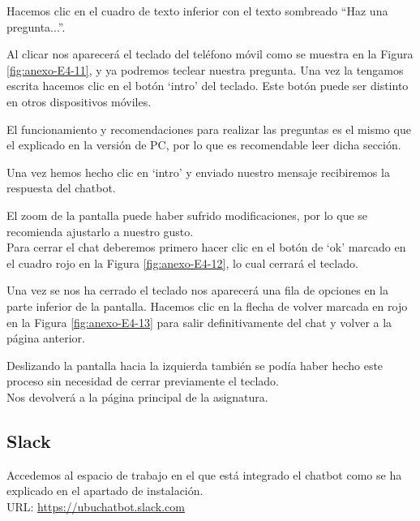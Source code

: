 
Hacemos clic en el cuadro de texto inferior con el texto sombreado ``Haz una pregunta...''.

\newpage

Al clicar nos aparecerá el teclado del teléfono móvil como se muestra en la Figura \ref{fig:anexo-E4-11}, y ya podremos teclear nuestra pregunta. Una vez la tengamos escrita hacemos clic en el botón `intro' del teclado. Este botón puede ser distinto en otros dispositivos móviles.


El funcionamiento y recomendaciones para realizar las preguntas es el mismo que el explicado en la versión de PC, por lo que es recomendable leer dicha sección.

\newpage

Una vez hemos hecho clic en `intro' y enviado nuestro mensaje recibiremos la respuesta del chatbot.

El zoom de la pantalla puede haber sufrido modificaciones, por lo que se recomienda ajustarlo a nuestro gusto.\\
Para cerrar el chat deberemos primero hacer clic en el botón de `ok' marcado en el cuadro rojo en la Figura \ref{fig:anexo-E4-12}, lo cual cerrará el teclado.

\newpage

Una vez se nos ha cerrado el teclado nos aparecerá una fila de opciones en la parte inferior de la pantalla. Hacemos clic en la flecha de volver marcada en rojo en la Figura \ref{fig:anexo-E4-13} para salir definitivamente del chat y volver a la página anterior.


Deslizando la pantalla hacia la izquierda también se podía haber hecho este proceso sin necesidad de cerrar previamente el teclado.\\
Nos devolverá a la página principal de la asignatura.


\newpage
\subsection{Slack}

Accedemos al espacio de trabajo en el que está integrado el chatbot como se ha explicado en el apartado de instalación.\\
URL: \url{https://ubuchatbot.slack.com}

